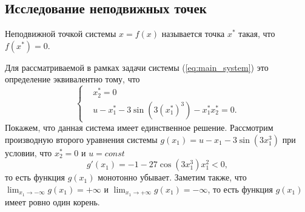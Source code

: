 \subsection{Исследование неподвижных точек}
\begin{definition}
        Неподвижной точкой системы $x = f(x)$ называется точка $x^*$ такая, что $f(x^*) = 0$.
\end{definition}
Для рассматриваемой в рамках задачи системы (\ref{eq:main_system}) это определение эквивалентно тому, что
$$
        \left\{
        \begin{aligned}
                & x_2^* = 0 \\
                & u - x_1^* - 3 \sin(3(x_1^*)^3) - x_1^* x_2^* = 0.
        \end{aligned}
        \right.
$$
Покажем, что данная система имеет единственное решение. Рассмотрим производную второго уравнения системы $g(x_1) = u - x_1 -  3 \sin(3x_1^3)$ при условии, что $x_2^* = 0$ и $u = const$
$$
        g'(x_1) = - 1 - 27\cos(3x_1^3)x_1^2 < 0,
$$
то есть функция $g(x_1)$ монотонно убывает. Заметим также, что $\lim_{x_1\to-\infty}g(x_1) = +\infty$ и $\lim_{x_1\to+\infty}g(x_1) = -\infty$, то есть функция $g(x_1)$ имеет ровно один корень.

